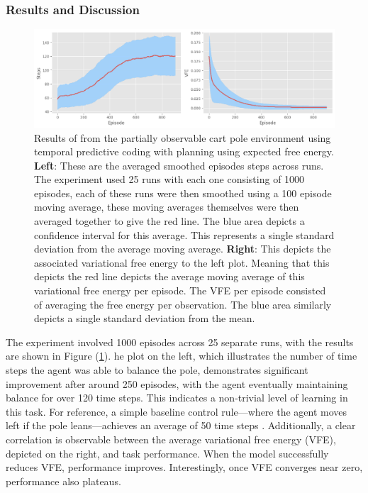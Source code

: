 \documentclass{article}
\newcommand{\refp}[1]{(\ref{#1})}
\begin{document}
\subsubsection{Results and Discussion}

\begin{figure}[htbp]
    \centering
    \includegraphics[scale=0.5]{images/tpc.png}
    \caption{Results of from the partially observable cart pole environment using temporal predictive coding with planning using expected free energy. \textbf{Left}: These are the averaged smoothed episodes steps across runs. The experiment used 25 runs with each one consisting of 1000 episodes, each of these runs were then smoothed using a 100 episode moving average, these moving averages themselves were then averaged together to give the red line. The blue area depicts a confidence interval for this average. This represents a single standard deviation from the average moving average. \textbf{Right}: This depicts the associated variational free energy to the left plot. Meaning that this depicts the red line depicts the average moving average of this variational free energy per episode. The VFE per episode consisted of averaging the free energy per observation. The blue area similarly depicts a single standard deviation from the mean.}
    \label{fig:tpc_results}
\end{figure}

The experiment involved 1000 episodes across 25 separate runs, with the results are shown in Figure \refp{fig:tpc_results}. he plot on the left, which illustrates the number of time steps the agent was able to balance the pole, demonstrates significant improvement after around 250 episodes, with the agent eventually maintaining balance for over 120 time steps. This indicates a non-trivial level of learning in this task. For reference, a simple baseline control rule—where the agent moves left if the pole leans—achieves an average of 50 time steps \citep{millidge2019combining}. Additionally, a clear correlation is observable between the average variational free energy (VFE), depicted on the right, and task performance. When the model successfully reduces VFE, performance improves. Interestingly, once VFE converges near zero, performance also plateaus.
\end{document}
